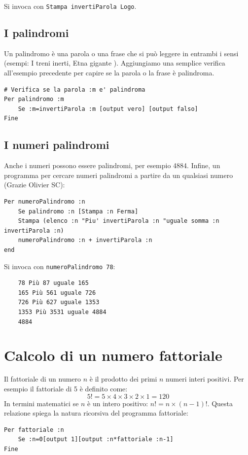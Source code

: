 Si invoca con \texttt{Stampa invertiParola \textquotedbl Logo}.

\subsection{I palindromi}
Un palindromo è una parola o una frase che si può leggere in entrambi i sensi (esempi: I treni inerti, Etna gigante \textellipsis ). Aggiungiamo una semplice verifica all'esempio precedente per capire se la parola o la frase è palindroma.
\begin{lstlisting}[caption="Verificare se una parola è palindroma"]
# Verifica se la parola :m e' palindroma
Per palindromo :m
	Se :m=invertiParola :m [output vero] [output falso]
Fine
\end{lstlisting}

\subsection{I numeri palindromi}
Anche i numeri possono essere palindromi, per esempio 4884. Infine, un programma per cercare numeri palindromi a partire da un qualsiasi numero (Grazie Olivier SC):
\begin{lstlisting}[caption="Scovare numeri palondromi"]
Per numeroPalindromo :n
	Se palindromo :n [Stampa :n Ferma]
	Stampa (elenco :n "Piu' invertiParola :n "uguale somma :n invertiParola :n)
	numeroPalindromo :n + invertiParola :n 
end
\end{lstlisting} 

Si invoca con \texttt{numeroPalindromo 78}:
\begin{verbatim}
	78 Più 87 uguale 165 
	165 Più 561 uguale 726 
	726 Più 627 uguale 1353 
	1353 Più 3531 uguale 4884 
	4884 
\end{verbatim} 



\section{Calcolo di un numero fattoriale}
\label{factorielle}
Il fattoriale di un numero $n$ è il prodotto dei primi $n$ numeri interi positivi. Per esempio il fattoriale di 5 è definito come: $$5!=5\times4\times3\times2\times1=120$$
In termini matematici se $n$ è un intero positivo: $n!=n\times(n-1)!$. Questa relazione spiega la natura ricorsiva del programma fattoriale:
\begin{lstlisting}[caption="La ricorsività nel calcolo del fattoriale"]
Per fattoriale :n
	Se :n=0[output 1][output :n*fattoriale :n-1]
Fine
\end{lstlisting}

